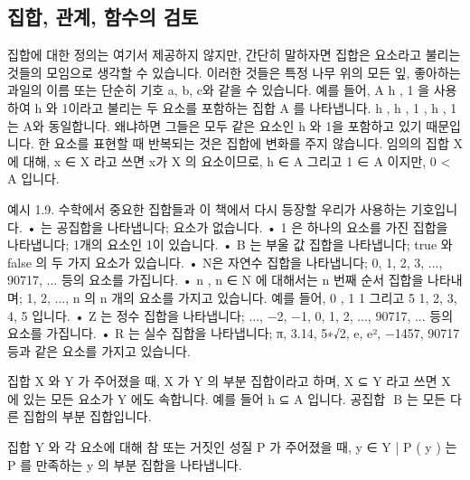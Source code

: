 \documentclass[11pt, a4paper, twoside, openany]{book}
\begin{document}
\subsection{집합, 관계, 함수의 검토}
\label{sec:1-2-1}

집합에 대한 정의는 여기서 제공하지 않지만, 간단히 말하자면 집합은 요소라고 불리는 것들의 모임으로 생각할 수 있습니다. 이러한 것들은 특정 나무 위의 모든 잎, 좋아하는 과일의 이름 또는 단순히 기호 a, b, c\hspace{0pt}와 같을 수 있습니다. 예를 들어, A  { h , 1 } 을 사용하여 h 와 1\hspace{0pt}이라고 불리는 두 요소를 포함하는 집합 A 를 나타냅니다. { h , h , 1 , h , 1 } 는 A\hspace{0pt}와 동일합니다.  왜냐하면 그들은 모두 같은 요소인 h 와 1\hspace{0pt}을 포함하고 있기 때문입니다. 한 요소를 표현할 때 반복되는 것은 집합에 변화를 주지 않습니다. 임의의 집합 X 에 대해, x ∈ X 라고 쓰면 x\hspace{0pt}가 X 의 요소이므로, h ∈ A 그리고 1 ∈ A 이지만, 0 < A 입니다.

\par\medskip
예시 1.9. 수학에서 중요한 집합들과 이 책에서 다시 등장할 우리가 사용하는 기호입니다.
•  는 공집합을 나타냅니다; 요소가 없습니다.
• { 1 } 은 하나의 요소를 가진 집합을 나타냅니다; 1\hspace{0pt}개의 요소인 1\hspace{0pt}이 있습니다.
• B 는 부울 값 집합을 나타냅니다; true 와 false 의 두 가지 요소가 있습니다.
• N\hspace{0pt}은 자연수 집합을 나타냅니다; 0, 1, 2, 3, ..., 90717, ... 등의 요소를 가집니다.
• n , n ∈ N 에 대해서는 n 번째 순서 집합을 나타내며; 1, 2, ..., n 의 n 개의 요소를 가지고 있습니다. 예를 들어, 0  , 1  { 1 } 그리고 5  { 1, 2, 3, 4, 5 } 입니다.
• Z 는 정수 집합을 나타냅니다; ..., −2, −1, 0, 1, 2, ..., 90717, ... 등의 요소를 가집니다.
• R 는 실수 집합을 나타냅니다; π, 3.14, 5∗√2, e, e², −1457, 90717 등과 같은 요소를 가지고 있습니다.

\par\medskip
집합 X 와 Y 가 주어졌을 때, X 가 Y 의 부분 집합이라고 하며, X ⊆ Y 라고 쓰면 X 에 있는 모든 요소가 Y 에도 속합니다. 예를 들어 { h } ⊆ A 입니다. 공집합  B {} 는 모든 다른 집합의 부분 집합입니다.

\par\medskip
집합 Y 와 각 요소에 대해 참 또는 거짓인 성질 P 가 주어졌을 때, { y ∈ Y | P ( y )} 는 P 를 만족하는 y 의 부분 집합을 나타냅니다.
\end{document}
